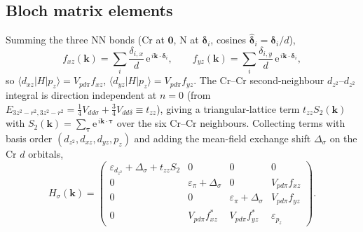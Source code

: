 \documentclass[11pt]{article}
\newcommand{\ee}{\mathrm{e}}
\begin{document}
\subsection{Bloch matrix elements}
Summing the three NN bonds (Cr at $\mathbf 0$, N at $\boldsymbol\delta_i$, cosines
$\hat{\boldsymbol\delta}_i=\boldsymbol\delta_i/d$),
\begin{equation}
f_{xz}(\mathbf k)=\sum_i \frac{\delta_{i,x}}{d}\,\ee^{\,i\mathbf k\cdot\boldsymbol\delta_i},\qquad
f_{yz}(\mathbf k)=\sum_i \frac{\delta_{i,y}}{d}\,\ee^{\,i\mathbf k\cdot\boldsymbol\delta_i},
\end{equation}
so $\langle d_{xz}|H|p_z\rangle=V_{pd\pi}f_{xz}$, $\langle d_{yz}|H|p_z\rangle=V_{pd\pi}f_{yz}$.
The Cr--Cr second-neighbour $d_{z^2}$--$d_{z^2}$ integral is direction independent at $n=0$
(from $E_{3z^2-r^2,3z^2-r^2}=\tfrac14 V_{dd\sigma}+\tfrac34 V_{dd\delta}\equiv t_{zz}$), giving a
triangular-lattice term $t_{zz}S_2(\mathbf k)$ with
$S_2(\mathbf k)=\sum_{\boldsymbol\tau}\ee^{\,i\mathbf k\cdot\boldsymbol\tau}$ over the six Cr--Cr
neighbours. Collecting terms with basis order $(d_{z^2},d_{xz},d_{yz},p_z)$ and adding the
mean-field exchange shift $\Delta_\sigma$ on the Cr $d$ orbitals,
\begin{equation}
H_\sigma(\mathbf k)=
\begin{pmatrix}
\varepsilon_{d_{z^2}}+\Delta_\sigma+t_{zz}S_2 & 0 & 0 & 0\\
0 & \varepsilon_\pi+\Delta_\sigma & 0 & V_{pd\pi}f_{xz}\\
0 & 0 & \varepsilon_\pi+\Delta_\sigma & V_{pd\pi}f_{yz}\\
0 & V_{pd\pi}f_{xz}^\ast & V_{pd\pi}f_{yz}^\ast & \varepsilon_{p_z}
\end{pmatrix}.
\end{equation}
\end{document}
